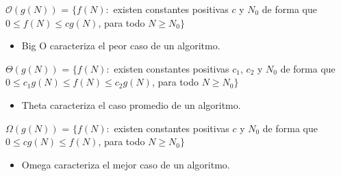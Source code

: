 \documentclass[11pt]{article}
\begin{document}
$\mathcal{O}(g(N))$ = $\{ f(N):$ existen constantes positivas $c$ y $N_0$ de forma que $0 \leq f(N) \leq cg(N)$, para todo $N \ge N_0 \}$
\begin{itemize}
    \item Big O caracteriza el peor caso de un algoritmo.
\end{itemize}
$\Theta(g(N))$ = $\{ f(N):$ existen constantes positivas $c_1$, $c_2$ y $N_0$ de forma que $0 \leq c_{1}g(N)\leq f(N) \leq c_{2}g(N)$, para todo $N \ge N_0 \}$
\begin{itemize}
    \item Theta caracteriza el caso promedio de un algoritmo.
\end{itemize}
$\Omega(g(N))$ = $\{ f(N):$ existen constantes positivas $c$ y $N_0$ de forma que $0 \leq cg(N) \leq f(N)$, para todo $N \ge N_0 \}$
\begin{itemize}
    \item Omega caracteriza el mejor caso de un algoritmo.
\end{itemize}
\end{document}
